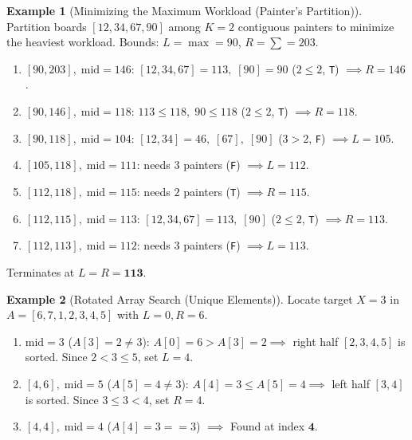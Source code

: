 \documentclass[11pt,a4paper]{article}
\theoremstyle{definition}
\newtheorem{example}{Example}[section]
\begin{document}
\begin{example}[Minimizing the Maximum Workload (Painter's Partition)]
Partition boards $[12, 34, 67, 90]$ among $K = 2$ contiguous painters to minimize the heaviest workload. Bounds: $L = \max = 90$, $R = \sum = 203$.
\begin{enumerate}
    \item $[90, 203],\; \text{mid} = 146$: $[12,34,67]=113,\; [90]=90$ ($2 \le 2$, \texttt{T}) $\implies R = 146$.
    \item $[90, 146],\; \text{mid} = 118$: $113 \le 118,\; 90 \le 118$ ($2 \le 2$, \texttt{T}) $\implies R = 118$.
    \item $[90, 118],\; \text{mid} = 104$: $[12,34]=46,\; [67],\; [90]$ ($3 > 2$, \texttt{F}) $\implies L = 105$.
    \item $[105, 118],\; \text{mid} = 111$: needs $3$ painters (\texttt{F}) $\implies L = 112$.
    \item $[112, 118],\; \text{mid} = 115$: needs $2$ painters (\texttt{T}) $\implies R = 115$.
    \item $[112, 115],\; \text{mid} = 113$: $[12,34,67]=113,\; [90]$ ($2 \le 2$, \texttt{T}) $\implies R = 113$.
    \item $[112, 113],\; \text{mid} = 112$: needs $3$ painters (\texttt{F}) $\implies L = 113$.
\end{enumerate}
Terminates at $L = R = \mathbf{113}$.
\end{example}

\begin{example}[Rotated Array Search (Unique Elements)]
Locate target $X = 3$ in $A = [6,7,1,2,3,4,5]$ with $L = 0, R = 6$.
\begin{enumerate}
    \item $\text{mid} = 3$ ($A[3] = 2 \neq 3$): $A[0] = 6 > A[3] = 2 \implies$ right half $[2,3,4,5]$ is sorted. Since $2 < 3 \le 5$, set $L = 4$.
    \item $[4, 6],\; \text{mid} = 5$ ($A[5] = 4 \neq 3$): $A[4] = 3 \le A[5] = 4 \implies$ left half $[3, 4]$ is sorted. Since $3 \le 3 < 4$, set $R = 4$.
    \item $[4, 4],\; \text{mid} = 4$ ($A[4] = 3 == 3$) $\implies$ Found at index $\mathbf{4}$.
\end{enumerate}
\end{example}
\end{document}
